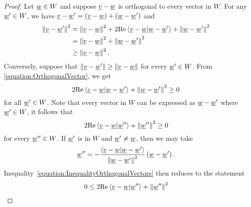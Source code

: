 \begin{proof}
Let $\underline{w} \in W$ and suppose $\underline{v} - \underline{w}$ is orthogonal to every vector in $W$.
For any $\underline{w}' \in W$, we have $\underline{v} - \underline{w}' = \left( \underline{v} - \underline{w} \right) + \left( \underline{w} - \underline{w}' \right)$ and
\begin{equation} \label{equation:OrthogonalVector}
\begin{split}
\left\| \underline{v} - \underline{w}' \right\|^2
&= \left\| \underline{v} - \underline{w} \right\|^2
+ 2 \mathrm{Re} \left\langle \underline{v} - \underline{w} | \underline{w} - \underline{w}' \right\rangle
+ \left\| \underline{w} - \underline{w}' \right\|^2 \\
&= \left\| \underline{v} - \underline{w} \right\|^2
+ \left\| \underline{w} - \underline{w}' \right\|^2 \\
&\geq \left\| \underline{v} - \underline{w} \right\|^2.
\end{split}
\end{equation}
Conversely, suppose that $\left\| \underline{v} - \underline{w}' \right\| \geq \left\| \underline{v} - \underline{w} \right\|$ for every $\underline{w}' \in W$.
From \eqref{equation:OrthogonalVector}, we get
\begin{equation*}
2 \mathrm{Re} \left\langle \underline{v} - \underline{w} | \underline{w} - \underline{w}' \right\rangle
+ \left\| \underline{w} - \underline{w}' \right\|^2 \geq 0
\end{equation*}
for all $\underline{w}' \in W$.
Note that every vector in $W$ can be expressed as $\underline{w} - \underline{w}'$ where $\underline{w}' \in W$, it follows that
\begin{equation} \label{equation:InequalityOrthogonalVectors}
2 \mathrm{Re} \left\langle \underline{v} - \underline{w} | \underline{w}'' \right\rangle
+ \left\| \underline{w}'' \right\|^2 \geq 0
\end{equation}
for every $\underline{w}'' \in W$.
If $\underline{w}'$ is in $W$ and $\underline{w}' \neq \underline{w}$, then we may take
\begin{equation*}
\underline{w}'' = - \frac{ \left\langle \underline{v} - \underline{w} | \underline{w} - \underline{w}' \right\rangle }{ \left\| \underline{w} - \underline{w}' \right\|^2 } \left( \underline{w} - \underline{w}' \right).
\end{equation*}
Inequality~\eqref{equation:InequalityOrthogonalVectors} then reduces to the statement
\begin{equation}
\begin{split}
0 &\leq
2 \Real \left\langle \vecnot{v} - \vecnot{w} | \vecnot{w}'' \right\rangle
+ \left\| \vecnot{w}'' \right\|^2 \\

\end{split}
\end{equation}
\end{proof}
